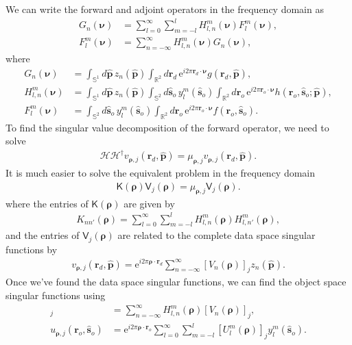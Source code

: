 \documentclass[11pt]{article}
\newcommand{\me}{\mathrm{e}}
\providecommand{\mb}[1]{\mathbf{#1}}
\providecommand{\mc}[1]{\mathcal{#1}}
\providecommand{\ro}[1]{\mathbf{\mathbf{r}}_o}
\providecommand{\so}[1]{\mathbf{\hat{s}}_o}
\providecommand{\rd}[1]{\mathbf{r}_d}
\providecommand{\mh}[1]{\mathbf{\hat{#1}}}
\providecommand{\mbb}[1]{\mathbb{#1}}
\providecommand{\bs}[1]{\boldsymbol{#1}}
\begin{document}
We can write the forward and adjoint operators in the frequency domain as
\begin{align}
  G_n(\bs{\nu}) &= \sum_{l=0}^{\infty}\sum_{m=-l}^{l}H_{l,n}^m(\bs{\nu})F_l^m(\bs{\nu}),\label{eq:fwd}\\
  F_l^m(\bs{\nu}) &= \sum_{n=-\infty}^{\infty}H_{l,n}^m(\bs{\nu})G_n(\bs{\nu}),
\end{align}
where
\begin{align}
  G_{n}(\bs{\nu}) &= \int_{\mbb{S}^1}d\mh{p}\, z_n(\mh{p})\int_{\mbb{R}^2}d\rd{}\, \me{}^{i2\pi\rd{}\cdot\bs{\nu}}g(\rd{}, \mh{p}),\\
  H_{l,n}^m(\bs{\nu}) &= \int_{\mbb{S}^1}d\mh{p}\, z_n(\mh{p})\int_{\mbb{S}^2}d\so{}\, y_l^m(\so{})\int_{\mbb{R}^2}d\ro{}\, \me{}^{i2\pi\ro{}\cdot\bs{\nu}}h(\ro{}, \so{}; \mh{p}),\label{eq:genft}\\ 
  F_{l}^m(\bs{\nu}) &= \int_{\mbb{S}^2}d\so{}\, y_l^m(\so{})\int_{\mbb{R}^2}d\ro{}\, \me{}^{i2\pi\ro{}\cdot\bs{\nu}}f(\ro{}, \so{}).
\end{align}
To find the singular value decomposition of the forward operator, we need to solve
\begin{align}
  \mc{H}\mc{H}^{\dagger} v_{\bs{\rho},j}(\rd{}, \hat{\mb{p}}) = \mu_{\bs{\rho},j}v_{\bs{\rho},j}(\rd{}, \hat{\mb{p}}). 
\end{align}
It is much easier to solve the equivalent problem in the frequency domain
\begin{align}
  \mathsf{K}(\bs{\rho})\mathsf{V}_j(\bs{\rho}) = \mu_{\bs{\rho},j}\mathsf{V}_j(\bs{\rho}). \label{eq:freqsvd}
\end{align}
where the entries of $\mathsf{K}(\bs{\rho})$ are given by
\begin{align}
  K_{nn'}(\bs{\rho}) = \sum_{l=0}^\infty\sum_{m=-l}^{l}H_{l,n}^m(\bs{\rho})H_{l,n'}^m(\bs{\rho}),
\end{align}
and the entries of $\mathsf{V}_j(\bs{\rho})$ are related to the complete data space singular functions by
\begin{align}
  v_{\bs{\rho},j}(\rd{}, \mh{p}) = \me{}^{i 2\pi \bs{\rho}\cdot\rd{}}\sum_{n=-\infty}^{\infty}[V_n(\bs{\rho})]_j z_n(\mh{p}). \label{eq:eigfunc}
\end{align}
Once we've found the data space singular functions, we can find the object space singular functions using
\begin{align}
  [U_l^m(\bs{\rho})]_j &= \sum_{n=-\infty}^{\infty} H_{l,n}^m(\bs{\rho})[V_n(\bs{\rho})]_j, \label{eq:eigenfuncobj}\\
  u_{\bs{\rho}, j}(\ro{}, \so{}) &= \me{}^{i2\pi\bs{\rho}\cdot\ro{}}\sum_{l=0}^{\infty}\sum_{m=-l}^l [U_l^m(\bs{\rho})]_j y_l^m(\so{}).
\end{align}
\end{document}
